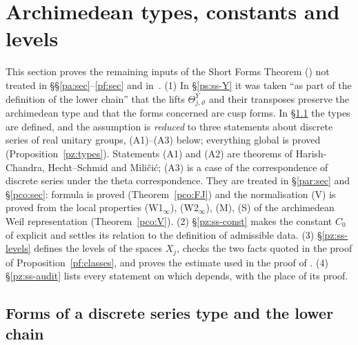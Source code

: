\documentclass[10pt]{amsart}
\theoremstyle{definition}
\theoremstyle{remark}
\begin{document}
\section{Archimedean types, constants and levels}\label{pz:sec}

This section proves the remaining inputs of the Short Forms Theorem ({\cite[Theorem~14.13]{P46}}) not treated in
\S\S\ref{pa:sec}--\ref{pf:sec} and in~\cite{P50}. (1) In \S\ref{ps:ss-Y} it was taken ``as part of the definition of the lower
chain'' that the lifts $\Theta^Y_{j,\vartheta}$ and their transposes preserve the archimedean type
and that the forms concerned are cusp forms. In \S\ref{pz:ss-types} the types are defined, and the
assumption is \emph{reduced} to three statements about discrete series of real unitary groups,
(A1)--(A3) below; everything global is proved (Proposition~\ref{pz:types}). Statements (A1) and
(A2) are theorems of Harish-Chandra, Hecht--Schmid and Mili\v ci\'c; (A3) is a case of the
correspondence of discrete series under the theta correspondence. They are treated in \S\ref{par:sec} and \S\ref{pco:sec}: formula {\cite[(59)]{P51}} is proved (Theorem~\ref{pco:FJ}) and the normalisation (V) is proved from the local properties (W1$_\infty$), (W2$_\infty$), (M), (S) of the archimedean Weil representation (Theorem~\ref{pco:V}). (2) \S\ref{pz:ss-const} makes the constant $C_0$ of
{\cite[Proposition~14.23]{P46}} explicit and settles its relation to the definition of admissible data.
(3) \S\ref{pz:ss-levels} defines the levels of the spaces $X_j$, checks the two facts quoted in the
proof of Proposition~\ref{pf:classes}, and proves the estimate used in the proof of
{\cite[Proposition~14.22]{P46}}. (4) \S\ref{pz:ss-audit} lists every statement on
which {\cite[Theorem~14.13]{P46}} depends, with the place of its proof.

\subsection{Forms of a discrete series type and the lower chain}\label{pz:ss-types}
\end{document}
